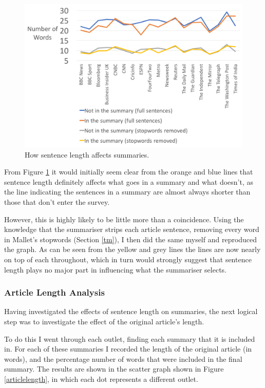 \documentclass[12pt]{article}
\begin{document}
\begin{figure}[ht!]
  \centering
    \includegraphics[scale=0.4]{sentencestats.png}
   \caption[A graph depicting responses to the User Interface Survey]{How sentence length affects summaries.}
   \label{sentencestats}
\end{figure}

From Figure \ref{sentencestats} it would initially seem clear from the orange and blue lines that sentence length definitely affects what goes in a summary and what doesn't, as the line indicating the sentences in a summary are almost always shorter than those that don't enter the survey. 

However, this is highly likely to be little more than a coincidence. Using the knowledge that the summariser strips each article sentence, removing every word in Mallet's stopwords (Section \ref{tm}), I then did the same myself and reproduced the graph. As can be seen from the yellow and grey lines the lines are now nearly on top of each throughout, which in turn would strongly suggest that sentence length plays no major part in influencing what the summariser selects.

\subsubsection{Article Length Analysis}

Having investigated the effects of sentence length on summaries, the next logical step was to investigate the effect of the original article's length.

To do this I went through each outlet, finding each summary that it is included in. For each of these summaries I recorded the length of the original article (in words), and the percentage number of words that were included in the final summary. The results are shown in the scatter graph shown in Figure \ref{articlelength}, in which each dot represents a different outlet.
\end{document}
